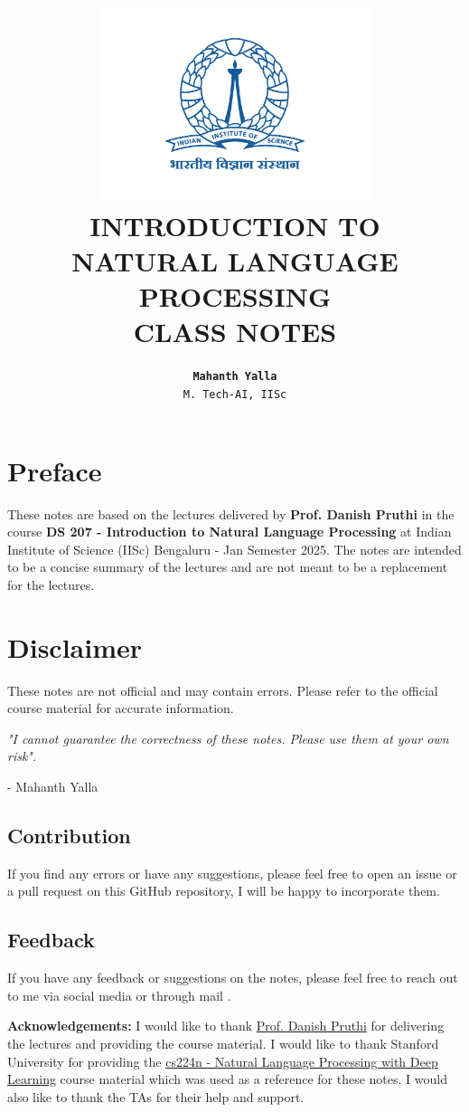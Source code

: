 \documentclass{report}
\title{
    \vspace{-2cm} %
    \includegraphics[width=8cm]{iisc-logo.png}\\ %
    \vspace{1cm} %
    \textsf{\huge INTRODUCTION TO}\\
    {\huge \textbf{NATURAL LANGUAGE PROCESSING}}\\
    \vspace{0.5cm} %
    \textsf{\large CLASS NOTES}
}
\author{\LARGE{\textbf{\texttt{Mahanth Yalla}}}\\ \texttt{\large M. Tech-AI, IISc}}
\date{}
\begin{document}
\begin{titlepage}
    \centering
    \maketitle
\end{titlepage}

\newpage
{}

\section*{Preface}
These notes are based on the lectures delivered by {\bf Prof. Danish Pruthi} in the course {\bf DS 207 - Introduction to Natural Language Processing} 
at Indian Institute of Science (IISc) Bengaluru - Jan Semester 2025. 
The notes are intended to be a concise summary of the lectures and are not meant to be a replacement for the lectures. 

\section*{Disclaimer}
These notes are not official and may contain errors. Please refer to the official course material for accurate information.

\textit{"I cannot guarantee the correctness of these notes. Please use them at your own risk".}

\hfill- Mahanth Yalla 

\subsection*{Contribution}
If you find any errors or have any suggestions, please feel free to open an issue or a pull request on this GitHub repository, I will be happy to incorporate them.
\subsection*{Feedback}
If you have any feedback or suggestions on the notes, please feel free to reach out to me via social media or through mail  .

\vfill
{\bf Acknowledgements:} I would like to thank \href{https://danishpruthi.com/}{Prof. Danish Pruthi} for delivering the lectures and providing the course material. 
I would like to thank Stanford University for providing the \href{https://web.stanford.edu/class/cs224n/}{cs224n - Natural Language Processing with Deep Learning} course material which was used as a reference for these notes.
I would also like to thank the TAs for their help and support. 

\tableofcontents
\pagebreak
{} 







\end{document}
